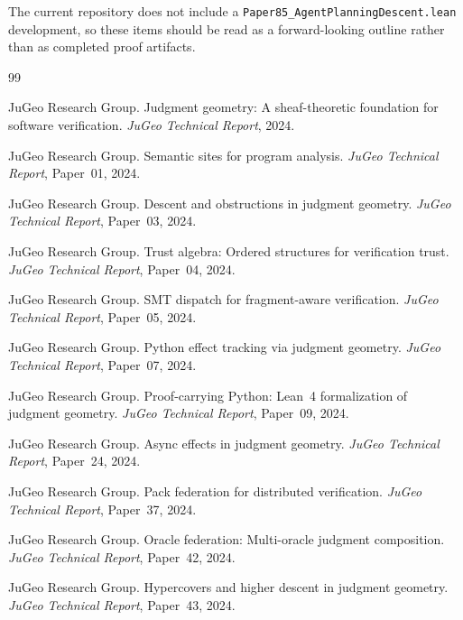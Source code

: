 \documentclass[11pt]{article}
\begin{document}
The current repository does not include a
\texttt{Paper85\_AgentPlanningDescent.lean} development, so these items
should be read as a forward-looking outline rather than as completed
proof artifacts.



\begin{thebibliography}{99}

JuGeo Research Group.
\newblock Judgment geometry: A sheaf-theoretic foundation for
  software verification.
\newblock \emph{JuGeo Technical Report}, 2024.

JuGeo Research Group.
\newblock Semantic sites for program analysis.
\newblock \emph{JuGeo Technical Report}, Paper~01, 2024.

JuGeo Research Group.
\newblock Descent and obstructions in judgment geometry.
\newblock \emph{JuGeo Technical Report}, Paper~03, 2024.

JuGeo Research Group.
\newblock Trust algebra: Ordered structures for verification trust.
\newblock \emph{JuGeo Technical Report}, Paper~04, 2024.

JuGeo Research Group.
\newblock SMT dispatch for fragment-aware verification.
\newblock \emph{JuGeo Technical Report}, Paper~05, 2024.

JuGeo Research Group.
\newblock Python effect tracking via judgment geometry.
\newblock \emph{JuGeo Technical Report}, Paper~07, 2024.

JuGeo Research Group.
\newblock Proof-carrying Python: Lean~4 formalization of judgment
  geometry.
\newblock \emph{JuGeo Technical Report}, Paper~09, 2024.

JuGeo Research Group.
\newblock Async effects in judgment geometry.
\newblock \emph{JuGeo Technical Report}, Paper~24, 2024.

JuGeo Research Group.
\newblock Pack federation for distributed verification.
\newblock \emph{JuGeo Technical Report}, Paper~37, 2024.

JuGeo Research Group.
\newblock Oracle federation: Multi-oracle judgment composition.
\newblock \emph{JuGeo Technical Report}, Paper~42, 2024.

JuGeo Research Group.
\newblock Hypercovers and higher descent in judgment geometry.
\newblock \emph{JuGeo Technical Report}, Paper~43, 2024.


\end{thebibliography}
\end{document}
